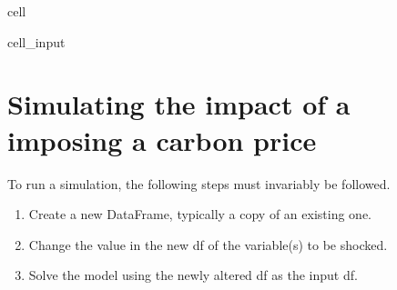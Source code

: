 \documentclass[letterpaper,10pt,english]{jupyterBook}
\begin{document}
\begin{sphinxuseclass}{cell}
\begin{sphinxVerbatimInput}
\begin{sphinxuseclass}{cell_input}
\begin{sphinxVerbatim}[commandchars=\\\{\}]
  
  
\end{sphinxVerbatim}

\end{sphinxuseclass}\end{sphinxVerbatimInput}

\end{sphinxuseclass}

\section{Simulating the impact of a imposing a carbon price}
\label{\detokenize{content/05_WBModels/MoreComplexScenarios:simulating-the-impact-of-a-imposing-a-carbon-price}}
\sphinxAtStartPar
To run a simulation, the following steps must invariably be followed.
\begin{enumerate}
%
\item {} 
\sphinxAtStartPar
Create a new DataFrame, typically a copy of an existing one.

\item {} 
\sphinxAtStartPar
Change the value  in the new df of the variable(s) to be shocked.

\item {} 
\sphinxAtStartPar
Solve the model using the newly altered df as the input df.

\end{enumerate}
\end{document}
